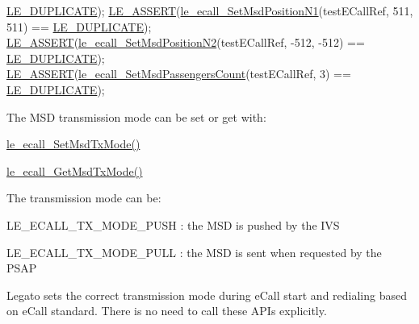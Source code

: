 \begin{DoxyCodeInclude}
      \hyperlink{le__basics_8h_a1cca095ed6ebab24b57a636382a6c86cac26034778a666ee720b110c2fb1647ea}{LE\_DUPLICATE});
    \hyperlink{le__log_8h_ac0dbbef91dc0fed449d0092ff0557b39}{LE\_ASSERT}(\hyperlink{le__ecall__interface_8h_af3cfea09eea1b1ba39648798070ad139}{le\_ecall\_SetMsdPositionN1}(testECallRef, 511, 511) == 
      \hyperlink{le__basics_8h_a1cca095ed6ebab24b57a636382a6c86cac26034778a666ee720b110c2fb1647ea}{LE\_DUPLICATE});
    \hyperlink{le__log_8h_ac0dbbef91dc0fed449d0092ff0557b39}{LE\_ASSERT}(\hyperlink{le__ecall__interface_8h_a6b25b9b242ba114f31ae2f853070bf11}{le\_ecall\_SetMsdPositionN2}(testECallRef, -512, -512) == 
      \hyperlink{le__basics_8h_a1cca095ed6ebab24b57a636382a6c86cac26034778a666ee720b110c2fb1647ea}{LE\_DUPLICATE});
    \hyperlink{le__log_8h_ac0dbbef91dc0fed449d0092ff0557b39}{LE\_ASSERT}(\hyperlink{le__ecall__interface_8h_a8c009bb03d61dcd0ffbd9e986b692a85}{le\_ecall\_SetMsdPassengersCount}(testECallRef, 3) == 
      \hyperlink{le__basics_8h_a1cca095ed6ebab24b57a636382a6c86cac26034778a666ee720b110c2fb1647ea}{LE\_DUPLICATE});
\end{DoxyCodeInclude}
 The M\+SD transmission mode can be set or get with\+:
\begin{DoxyItemize}
\item \hyperlink{le__ecall__interface_8h_a00d3dbc99884375cf2487d6640767c40}{le\+\_\+ecall\+\_\+\+Set\+Msd\+Tx\+Mode()}
\item \hyperlink{le__ecall__interface_8h_a4319df67dc451fecb72e4e60ba7b6f6e}{le\+\_\+ecall\+\_\+\+Get\+Msd\+Tx\+Mode()}
\end{DoxyItemize}

The transmission mode can be\+:
\begin{DoxyItemize}
\item {\ttfamily L\+E\+\_\+\+E\+C\+A\+L\+L\+\_\+\+T\+X\+\_\+\+M\+O\+D\+E\+\_\+\+P\+U\+SH} \+: the M\+SD is pushed by the I\+VS
\item {\ttfamily L\+E\+\_\+\+E\+C\+A\+L\+L\+\_\+\+T\+X\+\_\+\+M\+O\+D\+E\+\_\+\+P\+U\+LL} \+: the M\+SD is sent when requested by the P\+S\+AP
\end{DoxyItemize}

Legato sets the correct transmission mode during e\+Call start and redialing based on e\+Call standard. There is no need to call these A\+P\+Is explicitly.


